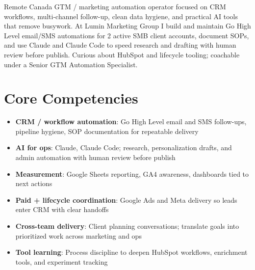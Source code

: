 \documentclass[11pt,a4paper,sans]{moderncv}
\begin{document}
\makecvtitle

\vspace{6pt}
\small{Remote Canada GTM / marketing automation operator focused on CRM workflows, multi-channel follow-up, clean data hygiene, and practical AI tools that remove busywork. At Lumin Marketing Group I build and maintain Go High Level email/SMS automations for 2 active SMB client accounts, document SOPs, and use Claude and Claude Code to speed research and drafting with human review before publish. Curious about HubSpot and lifecycle tooling; coachable under a Senior GTM Automation Specialist.}

\section{Core Competencies}
\vspace{1pt}
\begin{itemize}
\item \textbf{CRM / workflow automation}: Go High Level email and SMS follow-ups, pipeline hygiene, SOP documentation for repeatable delivery
\item \textbf{AI for ops}: Claude, Claude Code; research, personalization drafts, and admin automation with human review before publish
\item \textbf{Measurement}: Google Sheets reporting, GA4 awareness, dashboards tied to next actions
\item \textbf{Paid + lifecycle coordination}: Google Ads and Meta delivery so leads enter CRM with clear handoffs
\item \textbf{Cross-team delivery}: Client planning conversations; translate goals into prioritized work across marketing and ops
\item \textbf{Tool learning}: Process discipline to deepen HubSpot workflows, enrichment tools, and experiment tracking
\end{itemize}
\end{document}
